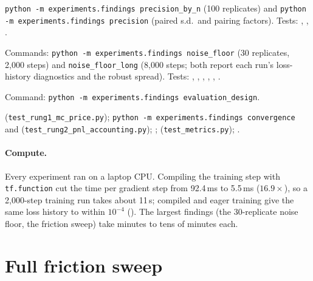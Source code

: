 \documentclass{article}
\begin{document}
{\begin{description}
  \texttt{python -m experiments.findings precision\_by\_n} (100 replicates) and
  \texttt{python -m experiments.findings precision} (paired s.d.\ and pairing factors). Tests:
  ,
  ,
  .
\item[Table~\ref{tab:power} and the 8{,}000-step result (noise floor and power).] Commands:
  \texttt{python -m experiments.findings noise\_floor} (30 replicates, 2{,}000 steps) and
  \texttt{noise\_floor\_long} (8{,}000 steps; both report each run's loss-history diagnostics
  and the robust spread). Tests:
  ,
  ,
  ,
  ,
  ,
  .
\item[Table~\ref{tab:gate} (acceptance gate).] Command:
  \texttt{python -m experiments.findings evaluation\_design}.
\item[Section~\ref{sec:setup} checks.] 
  (\texttt{test\_rung1\_mc\_price.py}); \texttt{python -m experiments.findings convergence} and
   (\texttt{test\_rung2\_pnl\_accounting.py});
  ;
  (\texttt{test\_metrics.py}); .
\end{description}
}

\paragraph{Compute.} Every experiment ran on a laptop CPU. Compiling the training step with
\texttt{tf.function} cut the time per gradient step from 92.4\,ms to 5.5\,ms ($16.9\times$), so a
2{,}000-step training run takes about 11\,s; compiled and eager training give the same loss
history to within $10^{-4}$ (). The largest findings
(the 30-replicate noise floor, the friction sweep) take minutes to tens of minutes each.

\section{Full friction sweep}\label{app:sweep}
\end{document}
